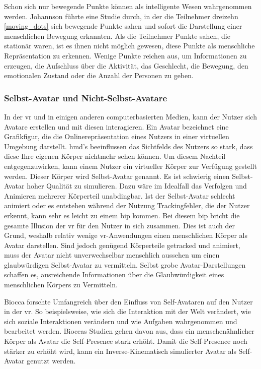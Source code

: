 \documentclass[a4paper,11pt]{article}%
\renewcommand{\\}{\vspace*{0.5\baselineskip} \newline}
\begin{document}
Schon sich nur bewegende Punkte können als intelligente Wesen wahrgenommen werden. Johannson \citep[p.76-89]{johansson1975visual} führte eine Studie durch, in der die Teilnehmer dreizehn \autoref{moving_dots} sich bewegende Punkte sahen und sofort die Darstellung einer menschlichen Bewegung erkannten. Als die Teilnehmer Punkte sahen, die stationär waren, ist es ihnen nicht möglich gewesen, diese Punkte als menschliche Repräsentation zu erkennen. Wenige Punkte reichen aus, um Informationen zu erzeugen, die Aufschluss über die Aktivität, das Geschlecht, die Bewegung, den emotionalen Zustand oder die Anzahl der Personen zu geben.

		\subsubsection{Selbst-Avatar und Nicht-Selbst-Avatare}

In der \ac{vr} und in einigen anderen computerbasierten Medien, kann der Nutzer sich Avatare erstellen und mit diesen interagieren. Ein Avatar bezeichnet eine Grafikfigur, die die Onlinerepräsentation eines Nutzers in einer virtuellen Umgebung darstellt. \citep[p.1]{neustaedter2009presenting} \\
\ac{hmd}'s beeinflussen das Sichtfelds des Nutzers so stark, dass diese Ihre eigenen Körper nichtmehr sehen können. Um diesem Nachteil entgegenzuwirken, kann einem Nutzer ein virtueller Körper zur Verfügung gestellt werden. Dieser Körper wird Selbst-Avatar genannt.
Es ist schwierig einen Selbst-Avatar hoher Qualität zu simulieren. Dazu wäre im Idealfall das Verfolgen und Animieren mehrerer Körperteil unabdingbar. Ist der Selbst-Avatar schlecht animiert oder es entstehen während der Nutzung Trackingfehler, die der Nutzer erkennt, kann sehr es leicht zu einem \ac{bip} kommen. Bei diesem \ac{bip} bricht die gesamte Illusion der \ac{vr} für den Nutzer in sich zusammen. 
Dies ist auch der Grund, weshalb relativ wenige \ac{vr}-Anwendungen einen menschlichen Körper als Avatar darstellen.
Sind jedoch genügend Körperteile getracked und animiert, muss der Avatar nicht unverwechselbar menschlich aussehen um einen glaubwürdigen Selbst-Avatar zu vermitteln. Selbst grobe Avatar-Darstellungen schaffen es, ausreichende Informationen über die Glaubwürdigkeit eines menschlichen Körpers zu Vermitteln. \citep{lok2003effects} 

Biocca forschte Umfangreich über den Einfluss von Self-Avataren auf den Nutzer in der \ac{vr}. \citep[421-427]{construal2014connected} 
\newline So beispielsweise, wie sich die Interaktion mit der Welt verändert, wie sich soziale Interaktionen verändern und wie Aufgaben wahrgenommen und bearbeitet werden. \citep{benford1995user} \citep{bowers1996talk}
Bioccas Studien gehen davon aus, dass ein menschenähnlicher Körper als Avatar die Self-Presence stark erhöht. Damit die Self-Presence noch stärker zu erhöht wird, kann ein Inverse-Kinematisch simulierter Avatar als Self-Avatar genutzt werden.
\end{document}
